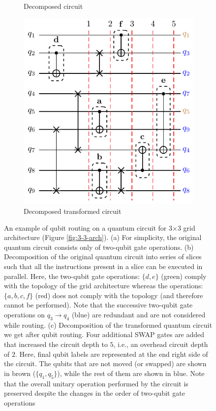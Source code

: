 \documentclass[%
 reprint,
 amsmath,amssymb,
 aps,
]{revtex4-2}
\begin{document}
\begin{figure}[t]
\begin{subfigure}[b]{0.30\linewidth}
        \caption{Decomposed circuit\label{fig:sliced_circ}}
    \end{subfigure}
    \begin{subfigure}[b]{0.33\linewidth}
        \includegraphics[width=\textwidth]{images/transformed_circ.pdf}
        \caption{Decomposed transformed circuit\label{fig:transformed_circ}}
    \end{subfigure}
    \caption{An example of qubit routing on a quantum circuit for 3$\times$3 grid architecture (Figure \ref{fig:3-3-arch}). (a) For simplicity, the original quantum circuit consists only of two-qubit gate operations. (b) Decomposition of the original quantum circuit into series of slices such that all the instructions present in a slice can be executed in parallel. Here, the two-qubit gate operations: $\{d,e\}$ (green) comply with the topology of the grid architecture whereas the operations: $\{a, b, c, f\}$ (red) does not comply with the topology (and therefore cannot be performed). Note that the successive two-qubit gate operations on $q_3\rightarrow q_4$ (blue) are redundant and are not considered while routing. (c) Decomposition of the transformed quantum circuit we get after qubit routing. Four additional SWAP gates are added that increased the circuit depth to $5$, i.e., an overhead circuit depth of $2$. Here, final qubit labels are represented at the end right side of the circuit. The qubits that are not moved (or swapped) are shown in brown ($\{q_1, q_5\}$), while the rest of them are shown in blue. Note that the overall unitary operation performed by the circuit is preserved despite the changes in the order of two-qubit gate operations}
    \label{fig:routing-example}
\end{figure}
\end{document}
